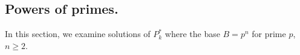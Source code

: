 \documentclass[sn-mathphys]{sn-jnl}%
\theoremstyle{thmstyleone}%
\newtheorem{lemma}[theorem]{Lemma}
\newtheorem{corollary}[theorem]{Corollary}
\theoremstyle{thmstyletwo}%
\theoremstyle{thmstylethree}%
\begin{document}
\begin{appendices}




\section{Powers of primes.}

In this section, we examine solutions of $P^*_k$ where the base $B = p^n$ for
prime $p$, $n \geq 2$.


\end{appendices}
\end{document}
